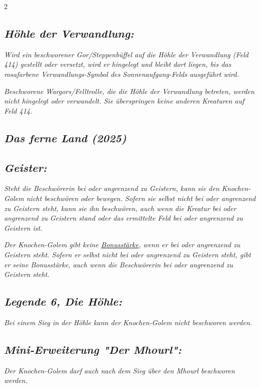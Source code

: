 \documentclass[10pt, a4paper, oneside]{book}
\newcommand{\fan}[1]{\textit{#1}}
\begin{document}
\begin{multicols*}{2}
\begin{bgcolor}
\subsection{\fan{Höhle der Verwandlung:}}

\fan{Wird ein beschworener Gor/Steppenbüffel auf die Höhle der Verwandlung (Feld 414) gestellt oder versetzt, wird er hingelegt und bleibt dort liegen, bis das rosafarbene Verwandlungs-Symbol des Sonnenaufgang-Felds ausgeführt wird.}

\fan{Beschworene Wargors/Felltrolle, die die Höhle der Verwandlung betreten, werden nicht hingelegt oder verwandelt. Sie überspringen keine anderen Kreaturen auf Feld 414.}

\end{bgcolor}






\begin{bgcolor}
\section{\fan{Das ferne Land (2025)}}

\subsection{\fan{Geister:}}

\fan{Steht die Beschwörerin bei oder angrenzend zu Geistern, kann sie den Knochen-Golem nicht beschwören oder bewegen. Sofern sie selbst nicht bei oder angrenzend zu Geistern steht, kann sie ihn beschwören, auch wenn die Kreatur bei oder angrenzend zu Geistern stand oder das ermittelte Feld bei oder angrenzend zu Geistern ist.}

\fan{Der Knochen-Golem gibt keine \hyperref[bonusstaerke]{Bonusstärke}, wenn er bei oder angrenzend zu Geistern steht. Sofern er selbst nicht bei oder angrenzend zu Geistern steht, gibt er seine Bonusstärke, auch wenn die Beschwörerin bei oder angrenzend zu Geistern steht.}


\subsection{\fan{Legende 6, Die Höhle:}}

\fan{Bei einem Sieg in der Höhle kann der Knochen-Golem nicht beschworen werden.}


\subsection{\fan{Mini-Erweiterung "Der Mhourl":}}

\fan{Der Knochen-Golem darf auch nach dem Sieg über den Mhourl beschworen werden.}



\end{bgcolor}




\end{multicols*}
\end{document}

